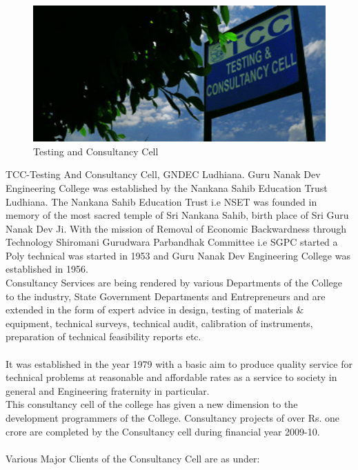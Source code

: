 \begin{figure}[ht]
\centering
\includegraphics[scale=0.7]{input/images/aw.jpg}
\caption{Testing and Consultancy Cell}
\end{figure}
\hspace{-1.7em} 
TCC-Testing And Consultancy Cell, GNDEC Ludhiana. Guru Nanak Dev Engineering College was established by the Nankana Sahib Education Trust Ludhiana. The Nankana Sahib Education Trust i.e NSET
was founded in memory of the most sacred temple of Sri Nankana Sahib, birth place
of Sri Guru Nanak Dev Ji. With the mission of Removal of Economic Backwardness
through Technology Shiromani Gurudwara Parbandhak Committee i.e SGPC started a
Poly technical was started in 1953 and Guru Nanak Dev Engineering College was established in 1956.\\
Consultancy Services are being rendered by various Departments of the College to the
industry, State Government Departments and Entrepreneurs and are extended in the form of
expert advice in design, testing of materials \& equipment, technical surveys, technical audit,
calibration of instruments, preparation of technical feasibility reports etc. \\\\
It was established in the year 1979 with a basic aim to produce
quality service for technical problems at reasonable and affordable rates as a service to society
in general and Engineering fraternity in particular.\\
This consultancy cell of the college has given a new dimension to the development
programmers of the College. Consultancy projects of over Rs. one crore are completed by the
Consultancy cell during financial year 2009-10. \\\\
Various Major Clients of the Consultancy Cell are as under:

